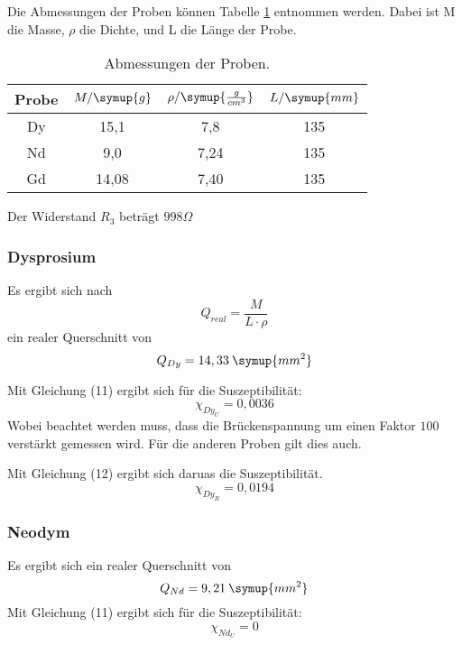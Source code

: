 Die Abmessungen der Proben können Tabelle \ref{tab:Dy} entnommen werden.
Dabei ist M die Masse, $\rho$ die Dichte, und L die Länge der Probe.

\begin{table}[H]
  \centering
  \caption{Abmessungen der Proben.}
  \label{tab:Dy}
  \begin{tabular}{c c c c}
    \toprule
    Probe & $M/ \symup{g}$ & $\rho / \symup{\frac{g}{cm^3}}$   & $L / \symup{mm}$  \\
    \midrule
    Dy & 15,1 & 7,8 & 135\\
    Nd & 9,0 & 7,24 & 135\\
    Gd & 14,08 & 7,40 & 135\\
    \bottomrule
  \end{tabular}
\end{table}


Der Widerstand $R_3$ beträgt $998 \Omega$

\subsubsection{Dysprosium}
Es ergibt sich nach
\begin{equation*}
  Q_{real} = \frac{M}{L \cdot \rho}
\end{equation*}
ein realer Querschnitt von
\begin{equation*}
  Q_{Dy} = 14,33 \: \symup{mm^2}
\end{equation*}

Mit Gleichung (11) ergibt sich für die Suszeptibilität:
\begin{equation*}
  \chi_{Dy_U} = 0,0036 %
\end{equation*}
Wobei beachtet werden muss, dass die Brückenspannung um einen Faktor $100$ verstärkt gemessen wird. Für die anderen
Proben gilt dies auch.

Mit Gleichung (12) ergibt sich daruas die Suszeptibilität.
\begin{equation*}
  \chi_{Dy_R} = 0,0194  %
\end{equation*}

\subsubsection{Neodym}
Es ergibt sich ein realer Querschnitt von
\begin{equation*}
  Q_{Nd} = 9,21 \: \symup{mm^2} %
\end{equation*}
Mit Gleichung (11) ergibt sich für die Suszeptibilität:
\begin{equation*}
  \chi_{Nd_U} = 0 %
\end{equation*}

